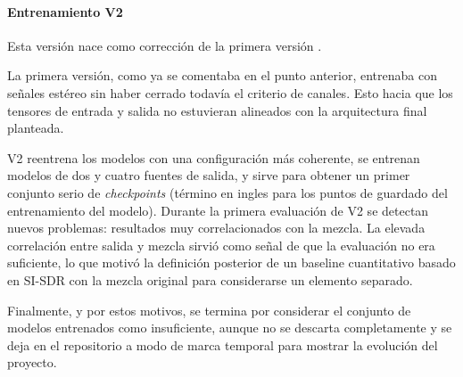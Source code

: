 \paragraph{Entrenamiento V2}
Esta versión nace como corrección de la primera versión .

La primera versión, como ya se comentaba en el punto anterior, entrenaba con señales estéreo sin haber cerrado todavía el criterio de canales. Esto hacia que los tensores de entrada y salida no estuvieran alineados con la arquitectura final planteada.

V2 reentrena los modelos con una configuración más coherente, se entrenan modelos de dos y cuatro fuentes de salida, y sirve para obtener un primer conjunto serio de \textit{checkpoints} (término en ingles para los puntos de guardado del entrenamiento del modelo). Durante la primera evaluación de V2 se detectan nuevos problemas: resultados muy correlacionados con la mezcla. La elevada correlación entre salida y mezcla sirvió como señal de que la evaluación no era suficiente, lo que motivó la definición posterior de un baseline cuantitativo basado en SI-SDR con la mezcla original para considerarse un elemento separado.

Finalmente, y por estos motivos, se termina por considerar el conjunto de modelos entrenados como insuficiente, aunque no se descarta completamente y se deja en el repositorio a modo de marca temporal para mostrar la evolución del proyecto.